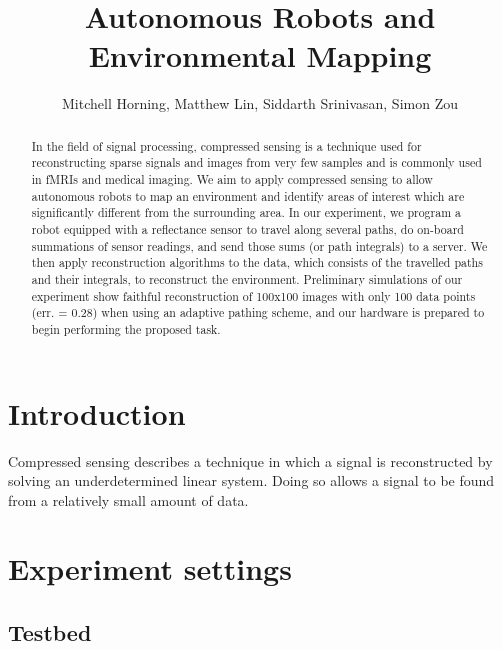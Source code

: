 \documentclass[english]{article}\usepackage[]{graphicx}\usepackage[]{color}
\begin{document}
\title{Autonomous Robots and Environmental Mapping}

\author{Mitchell Horning, Matthew Lin, Siddarth Srinivasan, Simon Zou}

\maketitle

\begin{abstract}

In the field of signal processing, compressed sensing is a technique used for 
reconstructing sparse signals and images from very few samples and is commonly 
used in fMRIs and medical imaging. We aim to apply compressed sensing to allow 
autonomous robots to map an environment and identify areas of interest which 
are significantly different from the surrounding area. In our experiment, we 
program a robot equipped with a reflectance sensor to travel along several 
paths, do on-board summations of sensor readings, and send those sums (or path 
integrals) to a server. We then apply reconstruction algorithms to the data,  
which consists of the travelled paths and their integrals, to reconstruct the 
environment. Preliminary simulations of our experiment show faithful 
reconstruction of 100x100 images with only 100 data points (err. = 0.28) when 
using an adaptive pathing scheme, and our hardware is prepared to begin 
performing the proposed task.

\end{abstract}

\tableofcontents

\section{Introduction}

\begin{comment}
Discuss Compressed Sensing

\end{comment}

Compressed sensing describes a technique in which a signal is reconstructed by 
solving an underdetermined linear system. Doing so allows a signal to be 
found from a relatively small amount of data.

\section{Experiment settings}
\subsection{Testbed}
\end{document}
